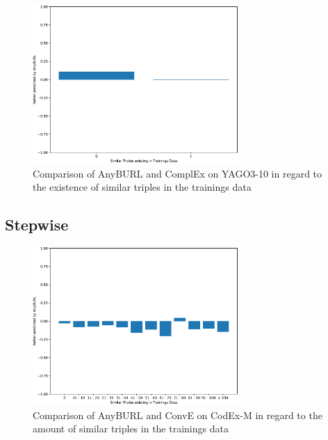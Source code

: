 \begin{figure}[H]
\centering
\includegraphics[width=0.7\textwidth]{images/similar_triples_binary_anyburl_complex_yago.PNG}
\caption{Comparison of AnyBURL and ComplEx on YAGO3-10 in regard to the existence of similar triples in the trainings data}
\label{fig:similar_triples_binary_anyburl_complex_yago}
\end{figure}

\subsection{Stepwise}

\begin{figure}[H]
\centering
\includegraphics[width=0.7\textwidth]{images/similar_triples_steps_anyburl_conve_codex.PNG}
\caption{Comparison of AnyBURL and ConvE on CodEx-M in regard to the amount of similar triples in the trainings data}
\label{fig:similar_triples_steps_anyburl_conve_codex}
\end{figure}

